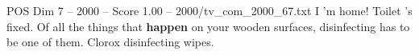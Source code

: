 \begin{textsample}{POS Dim 7 – 2000 – Score 1.00 – 2000/tv\_com\_2000\_67.txt}  \label{ex:f7_pos_052}
I 'm home!
Toilet 's fixed.
Of all the things that \textbf{happen} on your wooden surfaces, disinfecting has to be one of them.
Clorox disinfecting wipes.

\end{textsample}

